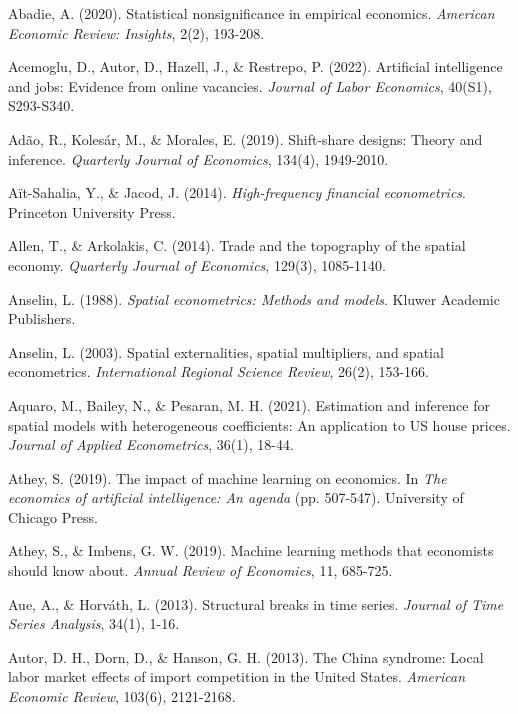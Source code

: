 \begin{thebibliography}{99}

Abadie, A. (2020). Statistical nonsignificance in empirical economics. \textit{American Economic Review: Insights}, 2(2), 193-208.

Acemoglu, D., Autor, D., Hazell, J., \& Restrepo, P. (2022). Artificial intelligence and jobs: Evidence from online vacancies. \textit{Journal of Labor Economics}, 40(S1), S293-S340.

Adão, R., Kolesár, M., \& Morales, E. (2019). Shift-share designs: Theory and inference. \textit{Quarterly Journal of Economics}, 134(4), 1949-2010.

Aït-Sahalia, Y., \& Jacod, J. (2014). \textit{High-frequency financial econometrics}. Princeton University Press.

Allen, T., \& Arkolakis, C. (2014). Trade and the topography of the spatial economy. \textit{Quarterly Journal of Economics}, 129(3), 1085-1140.

Anselin, L. (1988). \textit{Spatial econometrics: Methods and models}. Kluwer Academic Publishers.

Anselin, L. (2003). Spatial externalities, spatial multipliers, and spatial econometrics. \textit{International Regional Science Review}, 26(2), 153-166.

Aquaro, M., Bailey, N., \& Pesaran, M. H. (2021). Estimation and inference for spatial models with heterogeneous coefficients: An application to US house prices. \textit{Journal of Applied Econometrics}, 36(1), 18-44.

Athey, S. (2019). The impact of machine learning on economics. In \textit{The economics of artificial intelligence: An agenda} (pp. 507-547). University of Chicago Press.

Athey, S., \& Imbens, G. W. (2019). Machine learning methods that economists should know about. \textit{Annual Review of Economics}, 11, 685-725.

Aue, A., \& Horváth, L. (2013). Structural breaks in time series. \textit{Journal of Time Series Analysis}, 34(1), 1-16.

Autor, D. H., Dorn, D., \& Hanson, G. H. (2013). The China syndrome: Local labor market effects of import competition in the United States. \textit{American Economic Review}, 103(6), 2121-2168.


\end{thebibliography}
